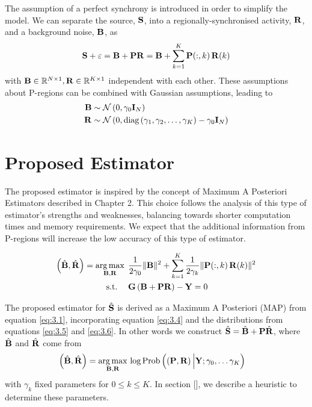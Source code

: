 The assumption of a perfect synchrony is introduced in order to simplify the model.
%
We can separate the source, $\mathbf{S}$, into a regionally-synchronised activity, $\mathbf{R}$, and a background noise, $\mathbf{B}$, as
\begin{equation}
    \mathbf{S} +\varepsilon = \mathbf{B} + \mathbf{P} \mathbf{R} = \mathbf{B} + \sum_{k=1}^K \mathbf{P}(:,k)\, \mathbf{R}(k)
    \label{eq:3.4}
\end{equation}
with $\mathbf{B} \in \mathbb{R}^{N\times 1}, \mathbf{R} \in \mathbb{R}^{K\times 1}$ independent with each other.
%
These assumptions about P-regions can be combined with Gaussian assumptions, leading to 
\begin{align}
    \mathbf{B} &\sim \mathcal{N}\left( 0, \gamma_0 \mathbf{I}_N  \right) 
    \label{eq:3.5} \\
    \mathbf{R} &\sim \mathcal{N}\left( 0, \text{diag}\left( \gamma_1, \gamma_2, \dots, \gamma_K \right)-\gamma_0 \mathbf{I}_N  \right)
    \label{eq:3.6}
\end{align}

\section{Proposed Estimator}

The proposed estimator is inspired by the concept of Maximum A Posteriori Estimators described in Chapter 2.
%
This choice follows the analysis of this type of estimator's strengths and weaknesses, balancing towards shorter computation times and memory requirements.
%
We expect that the additional information from P-regions will increase the low accuracy of this type of estimator.

\begin{align}
    \left(  \hat{\mathbf{B}}, \hat{\mathbf{R}}  \right) 
    =
    \operatorname*{arg\,max}_{\mathbf{B}, \mathbf{R} }\, 
    &\phantom{.}
    \frac{1}{2 \gamma_0} \lVert \mathbf{B} \rVert^2
    +
    \sum_{k=1}^K \frac{1}{2\gamma_k} \lVert \mathbf{P}(:,k)\, \mathbf{R}(k) \rVert^2
    \nonumber \\
    \text{s.t.}
    \quad
    &\phantom{.}
    {\mathbf{G} \left( \mathbf{B} + \mathbf{P} \mathbf{R} \right) } - \mathbf{Y} = 0
\end{align}

The proposed estimator for $\hat{\mathbf{S}}$ is derived as a Maximum A Posteriori (MAP) from equation \eqref{eq:3.1}, incorporating equation \eqref{eq:3.4} and the distributions from equations \eqref{eq:3.5} and \eqref{eq:3.6}.
%
In other words we construct $\hat{\mathbf{S}} = \hat{\mathbf{B}} + \mathbf{P} \hat{\mathbf{R}}$,
where $\hat{\mathbf{B}}$ and $\hat{\mathbf{R}}$ come from
\begin{align}
    \left(  \hat{\mathbf{B}}, \hat{\mathbf{R}}  \right) &=
    \operatorname*{arg\,max}_{\mathbf{B}, \mathbf{R} }\,
    \log \text{Prob}\left( \left(  {\mathbf{P}}, {\mathbf{R}}  \right) \Big| {\mathbf{Y}; \gamma_0, \dots \gamma_K}  \right)
\end{align}
with $\gamma_k$ fixed parameters for $0\leq k \leq K$. 
%
In section [], we describe a heuristic to determine these parameters.

